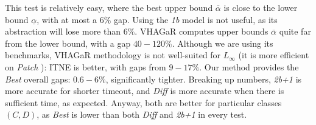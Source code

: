 \fi





\smallskip 

 This test is relatively easy, where the best upper bound $\bar{\alpha}$ is close to the lower bound $\underline{\alpha}$, with at most a $6\%$ gap. Using the {\em 1b} model is not useful, as its abstraction will lose more than $6\%$. 
VHAGaR computes upper bounds $\bar{\alpha}$ quite far from the lower bound, with a gap $40-120\%$. Although we are using its benchmarks, VHAGaR methodology is not well-suited for $L_\infty$ (it is more efficient on {\em Patch} \cite{vhagar}): ITNE is better, with gaps from $9-17\%$.
Our method provides the {\em Best} overall gaps: $0.6-6\%$, significantly tighter. Breaking up numbers, {\em 2b+1} is more accurate for shorter timeout, and {\em Diff} is more accurate when there is sufficient time, as expected. 
Anyway, both are better for particular classes $(C,D)$, as {\em Best} is lower than both {\em Diff} and {\em 2b+1} in every test.








%		
%		
%		
%		
%		
%		
%		
%		



